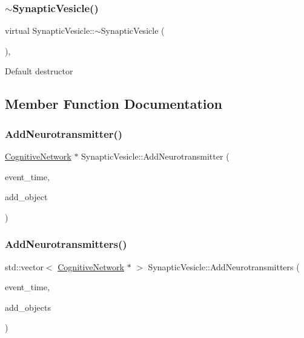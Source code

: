 \subsubsection{\texorpdfstring{$\sim$\+Synaptic\+Vesicle()}{~SynapticVesicle()}}
{\footnotesize\ttfamily virtual Synaptic\+Vesicle\+::$\sim$\+Synaptic\+Vesicle (\begin{DoxyParamCaption}{ }\end{DoxyParamCaption})\hspace{0.3cm}{\ttfamily [inline]}, {\ttfamily [virtual]}}

Default destructor 

\subsection{Member Function Documentation}
\mbox{\label{classSynapticVesicle_a56d406fdd01f267d868caedb390080ff}} 
\subsubsection{\texorpdfstring{Add\+Neurotransmitter()}{AddNeurotransmitter()}}
{\footnotesize\ttfamily \mbox{\hyperlink{classCognitiveNetwork}{Cognitive\+Network}} $\ast$ Synaptic\+Vesicle\+::\+Add\+Neurotransmitter (\begin{DoxyParamCaption}\item[{std\+::chrono\+::time\+\_\+point$<$ \mbox{\hyperlink{universe_8h_a0ef8d951d1ca5ab3cfaf7ab4c7a6fd80}{Clock}} $>$}]{event\+\_\+time,  }\item[{\mbox{\hyperlink{classCognitiveNetwork}{Cognitive\+Network}} $\ast$}]{add\+\_\+object }\end{DoxyParamCaption})}

\mbox{\label{classSynapticVesicle_ac924e6b7b824066a89136e52f2d5ce80}} 
\subsubsection{\texorpdfstring{Add\+Neurotransmitters()}{AddNeurotransmitters()}}
{\footnotesize\ttfamily std\+::vector$<$ \mbox{\hyperlink{classCognitiveNetwork}{Cognitive\+Network}} $\ast$ $>$ Synaptic\+Vesicle\+::\+Add\+Neurotransmitters (\begin{DoxyParamCaption}\item[{std\+::chrono\+::time\+\_\+point$<$ \mbox{\hyperlink{universe_8h_a0ef8d951d1ca5ab3cfaf7ab4c7a6fd80}{Clock}} $>$}]{event\+\_\+time,  }\item[{std\+::vector$<$ \mbox{\hyperlink{classCognitiveNetwork}{Cognitive\+Network}} $\ast$$>$}]{add\+\_\+objects }\end{DoxyParamCaption})}

